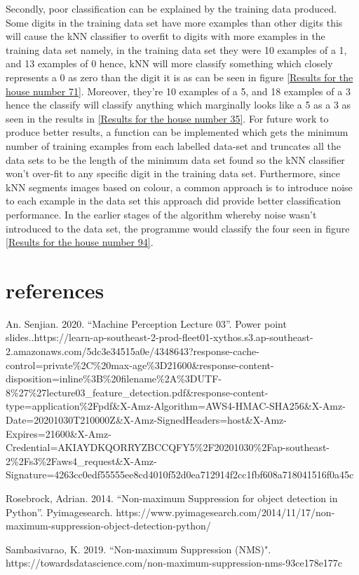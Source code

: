 \documentclass[
	12pt, %
]{fphw}
\begin{document}
Secondly, poor classification can be explained by the training data produced. Some digits in the training data set have more examples than other digits this will cause the kNN classifier to overfit to digits with more examples in the training data set namely, in the training data set they were 10 examples of a 1, and 13 examples of 0 hence, kNN will more classify something which closely represents a 0 as zero than the digit it is as can be seen in figure \ref{Results for the house number 71}. Moreover, they're 10 examples of a 5, and 18 examples of a 3 hence the classify will classify anything which marginally looks like a 5 as a 3 as seen in the results in \ref{Results for the house number 35}. For future work to produce better results, a  function can be implemented which gets the minimum number of training examples from each labelled data-set and truncates all the data sets to be the length of the minimum data set found so the kNN classifier won't over-fit to any specific digit in the training data set. Furthermore, since kNN segments images based on colour, a common approach is to introduce noise to each example in the data set this approach did provide better classification performance. In the earlier stages of the algorithm whereby noise wasn't introduced to the data set, the programme would classify the four seen in figure \ref{Results for the house number 94}.

\section{references}

An. Senjian. 2020. “Machine Perception Lecture 03”. Power point slides..https://learn-ap-southeast-2-prod-fleet01-xythos.s3.ap-southeast-2.amazonaws.com/5dc3e34515a0e/4348643?response-cache-control=private\%2C\%20max-age\%3D21600\&response-content-disposition=inline\%3B\%20filename\%2A\%3DUTF-8\%27\%27lecture03\_feature\_detection.pdf\&response-content-type=application\%2Fpdf\&X-Amz-Algorithm=AWS4-HMAC-SHA256\&X-Amz-Date=20201030T210000Z\&X-Amz-SignedHeaders=host\&X-Amz-Expires=21600\&X-Amz-Credential=AKIAYDKQORRYZBCCQFY5\%2F20201030\%2Fap-southeast-2\%2Fs3\%2Faws4\_request\&X-Amz-Signature=4263cc0edf55555ee8cd4010f52d0ea712914f2cc1fbf608a718041516f0a45c


Rosebrock, Adrian. 2014. “Non-maximum Suppression for object detection in Python”. Pyimagesearch. https://www.pyimagesearch.com/2014/11/17/non-maximum-suppression-object-detection-python/

Sambasivarao, K. 2019. “Non-maximum Suppression (NMS)". https://towardsdatascience.com/non-maximum-suppression-nms-93ce178e177c
\end{document}
